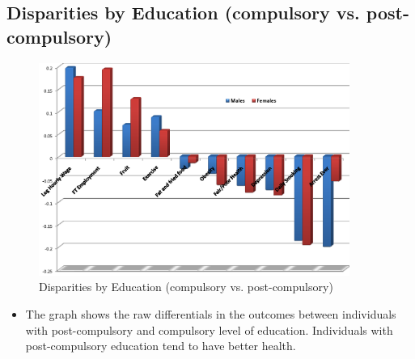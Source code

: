 \subsection{Disparities by Education (compulsory vs. post-compulsory)}
\begin{figure}[H]%
                \centering
                \includegraphics[width=4in]{images/ch3/34.png}
                \caption{Disparities by Education (compulsory vs. post-compulsory)}
                \label{fig:label}
            \end{figure}    
\begin{itemize}
        \item The graph shows the raw differentials in the outcomes between individuals with post-compulsory and compulsory level of education.          Individuals with post-compulsory education tend to have better health.
\end{itemize}

